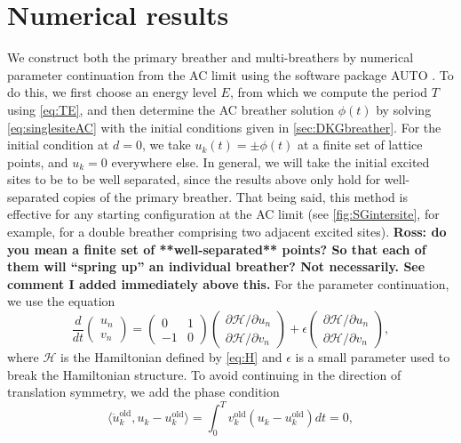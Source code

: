 \documentclass[12pt,reqno]{amsart}
\def\calH{\mathcal{H}}
\theoremstyle{definition}
\begin{document}
\section{Numerical results}\label{sec:numerics}

We construct both the primary breather and multi-breathers by numerical parameter continuation from the AC limit using the software package AUTO \cite{auto07p}. To do this, we first choose an energy level $E$, from which we compute the period $T$ using \cref{eq:TE}, and then determine the AC breather solution $\phi(t)$ by solving \cref{eq:singlesiteAC} with the initial conditions given in \cref{sec:DKGbreather}. For the initial condition at $d = 0$, we take $u_k(t) = \pm \phi(t)$ at a finite set of lattice points, and $u_k = 0$ everywhere else. In general, we will take the initial excited sites to be to be well separated, since the results above only hold for well-separated copies of the primary breather. That being said, this method is effective for any starting configuration at the AC limit (see \cref{fig:SGintersite}, for example, for a double breather comprising two adjacent excited sites).
{\bf Ross: do you mean a finite set of **well-separated** points?
So that each of them will ``spring up'' an individual breather? Not necessarily. See comment I added immediately above this.}
For the parameter continuation, we use the equation
\begin{equation}\label{eq:HformAUTO}
\frac{d}{dt}\begin{pmatrix} u_n \\ v_n \end{pmatrix} = 
\begin{pmatrix} 0 & 1 \\ -1 & 0 \end{pmatrix}\begin{pmatrix} \partial \calH / \partial u_n \\ \partial \calH / \partial v_n \end{pmatrix} + 
\epsilon \begin{pmatrix} \partial \calH / \partial u_n \\ \partial \calH / \partial v_n \end{pmatrix},
\end{equation}
where $\calH$ is the Hamiltonian defined by \cref{eq:H} and $\epsilon$ is a small parameter used to break the Hamiltonian structure. To avoid continuing in the direction of translation symmetry, we add the phase condition
\[
\langle \dot{u}_k^\text{old}, u_k - u_k^\text{old} \rangle =
\int_0^T v_k^\text{old}( u_k - u_k^\text{old}) dt = 0,
\]
\end{document}
